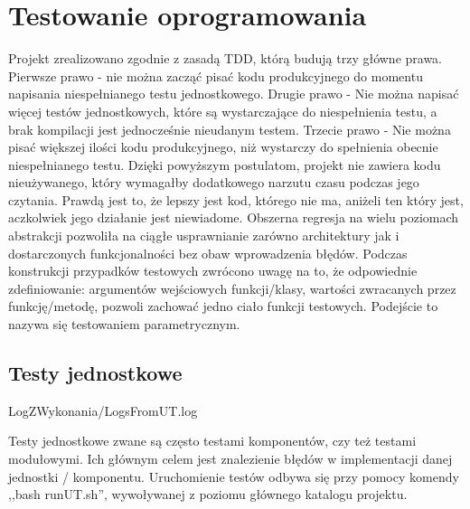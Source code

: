 \chapter{Testowanie oprogramowania}
    Projekt zrealizowano zgodnie z zasadą TDD, którą budują trzy główne prawa.
    \newline
    Pierwsze prawo - nie można zacząć pisać kodu produkcyjnego do momentu napisania niespełnianego testu jednostkowego.
    \newline
    Drugie prawo - Nie można napisać więcej testów jednostkowych, które są wystarczające do niespełnienia testu, a brak kompilacji jest jednocześnie nieudanym testem.
    \newline
    Trzecie prawo - Nie można pisać większej ilości kodu produkcyjnego, niż wystarczy do spełnienia obecnie niespełnianego testu.\cite{martin2014czysty}
    \newline
    Dzięki powyższym postulatom, projekt nie zawiera kodu nieużywanego, który wymagałby dodatkowego narzutu czasu podczas jego czytania. Prawdą jest to, że lepszy jest kod,
    którego nie ma, aniżeli ten który jest, aczkolwiek jego działanie jest niewiadome. Obszerna regresja na wielu poziomach abstrakcji pozwoliła na ciągłe usprawnianie zarówno architektury
    jak i dostarczonych funkcjonalności bez obaw wprowadzenia błędów. Podczas konstrukcji przypadków testowych zwrócono uwagę na to, że odpowiednie zdefiniowanie: 
    argumentów wejściowych funkcji/klasy, wartości zwracanych przez funkcję/metodę, pozwoli zachować jedno ciało funkcji testowych. Podejście to nazywa się testowaniem parametrycznym.

    
\section{Testy jednostkowe}
    
    {LogZWykonania/LogsFromUT.log}
    
    Testy jednostkowe zwane są często testami komponentów, czy też testami modułowymi. Ich głównym celem jest znalezienie błędów w implementacji danej jednostki / komponentu.
    \cite{Testowanie}
    Uruchomienie testów odbywa się przy pomocy komendy ,,bash runUT.sh'', wywoływanej z poziomu głównego katalogu projektu.
    
